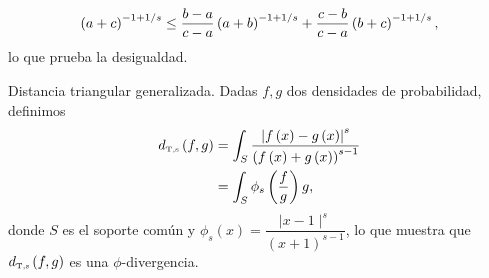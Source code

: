 \begin{dem}
\begin{enumerate}[i)]
		\begin{align*}
		\left( a+c \right)^{-1+1/s} \le \frac{b-a}{c-a} \left( a+b \right)^{-1+1/s}
		+ \frac{c-b}{c-a} \left( b+c \right)^{-1+1/s},
		\end{align*}
		lo que prueba la desigualdad.
	\end{enumerate}
\end{dem}

\begin{definition} Distancia triangular generalizada.
	\label{TriangularGeneralizada}
	Dadas $f,g$ dos densidades de probabilidad, definimos
	\begin{align}
	\nonumber \label{FiDT}d_{\text{\tiny{T},s}}\left( f,g \right) &= \displaystyle \int_{S} \dfrac{\left| f\left( x \right) - g\left( x \right) \right|^s}{\left( f\left( x \right) + g\left( x \right) \right)^{s-1}} \\
	&= \displaystyle \int_{S} \phi_s\left(\frac{f}{g}\right) g,
	\end{align}
	donde $S$ es el soporte común y $\phi_s(x)=\dfrac{\mid x-1\mid^s}{(x+1)^{s-1}}$,  lo que muestra que $d_{\text{\tiny{T},s}}\left( f,g \right)$ es una $\phi$-divergencia.
\end{definition}

